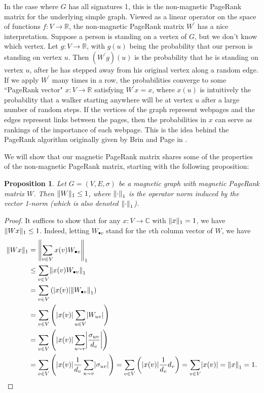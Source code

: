 \documentclass{article}
\newtheorem{prop}[thm]{Proposition}
\theoremstyle{definition}
\newcommand{\R}{\mathbb R}
\newcommand{\C}{\mathbb C}
\DeclarePairedDelimiter\abs{\lvert}{\rvert}
\DeclarePairedDelimiter\norm{\lVert}{\rVert}
\begin{document}
In the case where $G$ has all signatures 1, this is the non-magnetic PageRank matrix for the underlying simple graph. Viewed as a linear operator on the space of functions $f: V \rightarrow \R$, the non-magnetic PageRank matrix $W^\prime$ has a nice interpretation. Suppose a person is standing on a vertex of $G$, but we don't know which vertex. Let $g:V \rightarrow \R$, with $g(u)$ being the probability that our person is standing on vertex $u$. Then $(W^\prime g)(u)$ is the probability that he is standing on vertex $u$, after he has stepped away from his original vertex along a random edge. If we apply $W^\prime$ many times in a row, the probabilities converge to some ``PageRank vector" $x:V \rightarrow \R$ satisfying $W^\prime x = x$, where $x(u)$ is intuitively the probability that a walker starting anywhere will be at vertex $u$ after a large number of random steps. If the vertices of the graph represent webpages and the edges represent links between the pages, then the probabilities in $x$ can serve as rankings of the importance of each webpage. This is the idea behind the PageRank algorithm originally given by Brin and Page in \cite{brin}.

We will show that our magnetic PageRank matrix shares some of the properties of the non-magnetic PageRank matrix, starting with the following proposition:

\begin{prop}\label{operator norm of PageRank matrix leq 1}
Let $G=(V, E, \sigma)$ be a magnetic graph with magnetic PageRank matrix $W$. Then $\norm{W}_1 \leq 1$, where $\norm*{\cdot}_1$ is the operator norm induced by the vector 1-norm (which is also denoted $\norm*{\cdot}_1$).
\end{prop}
\begin{proof}
It suffices to show that for any $x: V \rightarrow \C$ with $\norm{x}_1 = 1$, we have $\norm{W x}_1 \leq 1$. Indeed, letting $W_{\bullet v}$ stand for the $v$th column vector of $W$, we have
\begin{align*}
\norm{W x}_1 &= \norm*{\sum_{v \in V} x(v) W_{\bullet v}}_1 \\
&\leq \sum_{v \in V} \norm*{x(v) W_{\bullet v}}_1 \\
&= \sum_{v \in V} \left( \abs*{x(v)} \norm*{W_{\bullet v}}_1 \right) \\
&= \sum_{v \in V} \left( \abs*{x(v)} \sum_{u \in V} \abs*{W_{u v}} \right) \\
&= \sum_{v \in V} \left( \abs*{x(v)} \sum_{u \sim v} \abs*{\frac{\sigma_{uv}}{d_v}} \right) \\
&= \sum_{v \in V} \left( \abs*{x(v)} \frac{1}{d_v} \sum_{u \sim v} \abs*{\sigma_{uv}} \right) 
= \sum_{v \in V} \left( \abs*{x(v)} \frac{1}{d_v} d_v \right) 
= \sum_{v \in V} \abs*{x(v)} 
= \norm*{x}_1 
= 1.
\end{align*}
\end{proof}
\end{document}
